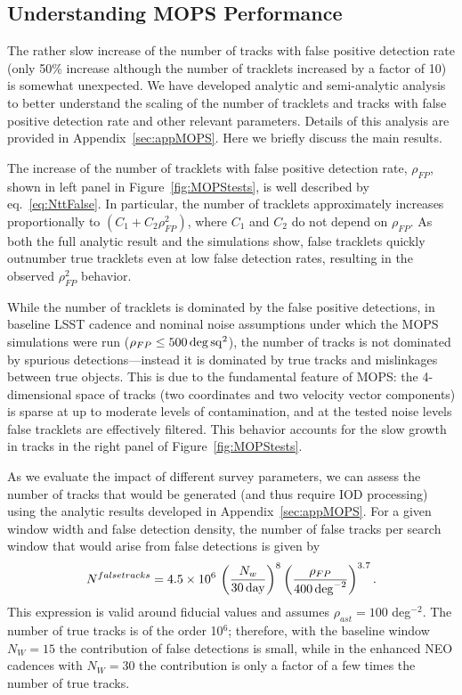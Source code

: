 \subsection{Understanding MOPS Performance}

The rather slow increase of the number of tracks with false positive detection rate (only 50\% increase
although the number of tracklets increased by a factor of 10) is somewhat unexpected. We have
developed analytic and semi-analytic analysis to better understand the scaling of the number of
tracklets and tracks with false positive detection rate and other relevant parameters. Details of this
analysis are provided in Appendix~\ref{sec:appMOPS}. Here we briefly discuss the main results.

The increase of the number of tracklets with false positive detection rate,
$\rho_{FP}$, shown in left panel in Figure~\ref{fig:MOPStests}, is well
described by eq.~\ref{eq:NttFalse}. In particular, the number of tracklets
approximately increases proportionally to $(C_1 + C_2\rho_{FP}^2)$, where $C_1$
and $C_2$ do not depend on $\rho_{FP}$. As both the full analytic result and the
simulations show, false tracklets quickly outnumber true tracklets even at low
false detection rates, resulting in the observed $\rho_{FP}^2$ behavior.

While the number of tracklets is dominated by the false positive detections, in
baseline LSST cadence and nominal noise assumptions under which the MOPS
simulations were run ($\rho_{FP} \leq 500\,\rm{deg} \,\rm{sq}^2$), the number of
tracks is not dominated by spurious detections---instead it is dominated by true
tracks and mislinkages between true objects. This is due to the fundamental
feature of MOPS: the 4-dimensional space of tracks (two coordinates and two
velocity vector components) is sparse at up to moderate levels of contamination,
and at the tested noise levels false tracklets are effectively filtered. This
behavior accounts for the slow growth in tracks in the right panel of
Figure~\ref{fig:MOPStests}.

As we evaluate the impact of different survey parameters, we can assess the
number of tracks that would be generated (and thus require IOD processing) using
the analytic results developed in Appendix~\ref{sec:appMOPS}. For a given window
width and false detection density, the number of false tracks per search window
that would arise from false detections is given by
\begin{equation}
\label{eq:falsetracks2}
   N^{falsetracks} = 4.5 \times 10^6 \, \left( {N_w \over 30 \, {\rm day} } \right)^{8} \left( {\rho_{FP} \over 400 \, {\rm deg}^{-2} }\right)^{3.7}.
\end{equation}
This expression is valid around fiducial values and assumes $\rho_{ast}=100$ deg$^{-2}$.
The number of true tracks is of the order 10$^6$; therefore, with the baseline
window $N_W=15$ the contribution of false detections is small, while in the
enhanced NEO cadences with $N_W=30$ the contribution is only a factor of a few
times the number of true tracks.

